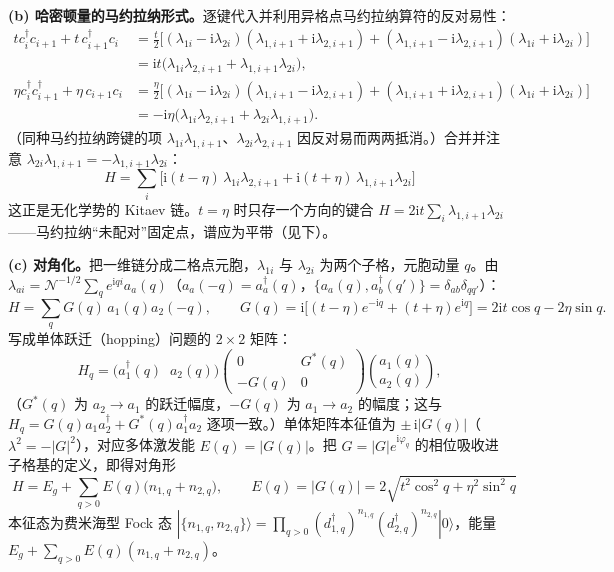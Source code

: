 \textbf{(b) 哈密顿量的马约拉纳形式。}逐键代入并利用异格点马约拉纳算符的反对易性：
\begin{align*}
tc^\dagger_ic_{i+1}+t\,c^\dagger_{i+1}c_i
&=\frac{t}{2}\big[(\lambda_{1i}-\mathrm{i}\lambda_{2i})(\lambda_{1,i+1}+\mathrm{i}\lambda_{2,i+1})+(\lambda_{1,i+1}-\mathrm{i}\lambda_{2,i+1})(\lambda_{1i}+\mathrm{i}\lambda_{2i})\big]\\
&=\mathrm{i}t\big(\lambda_{1i}\lambda_{2,i+1}+\lambda_{1,i+1}\lambda_{2i}\big),\\
\eta c^\dagger_ic^\dagger_{i+1}+\eta\,c_{i+1}c_i
&=\frac{\eta}{2}\big[(\lambda_{1i}-\mathrm{i}\lambda_{2i})(\lambda_{1,i+1}-\mathrm{i}\lambda_{2,i+1})+(\lambda_{1,i+1}+\mathrm{i}\lambda_{2,i+1})(\lambda_{1i}+\mathrm{i}\lambda_{2i})\big]\\
&=-\mathrm{i}\eta\big(\lambda_{1i}\lambda_{2,i+1}+\lambda_{2i}\lambda_{1,i+1}\big).
\end{align*}
（同种马约拉纳跨键的项 $\lambda_{1i}\lambda_{1,i+1}$、$\lambda_{2i}\lambda_{2,i+1}$ 因反对易而两两抵消。）合并并注意 $\lambda_{2i}\lambda_{1,i+1}=-\lambda_{1,i+1}\lambda_{2i}$：
\begin{equation*}
\boxed{\;H=\sum_i\Big[\mathrm{i}(t-\eta)\,\lambda_{1i}\lambda_{2,i+1}
+\mathrm{i}(t+\eta)\,\lambda_{1,i+1}\lambda_{2i}\Big]\;}
\end{equation*}
这正是无化学势的 Kitaev 链。$t=\eta$ 时只存一个方向的键合 $H=2\mathrm{i}t\sum_i\lambda_{1,i+1}\lambda_{2i}$——马约拉纳“未配对”固定点，谱应为平带（见下）。

\textbf{(c) 对角化。}把一维链分成二格点元胞，$\lambda_{1i}$ 与 $\lambda_{2i}$ 为两个子格，元胞动量 $q$。由 $\lambda_{ai}=\mathcal{N}^{-1/2}\sum_qe^{\mathrm{i}qi}a_a(q)$（$a_a(-q)=a^\dagger_a(q)$，$\{a_a(q),a^\dagger_b(q')\}=\delta_{ab}\delta_{qq'}$）：
\begin{equation*}
H=\sum_qG(q)\,a_1(q)a_2(-q),\qquad
G(q)=\mathrm{i}\big[(t-\eta)e^{-\mathrm{i}q}+(t+\eta)e^{\mathrm{i}q}\big]
=2\mathrm{i}t\cos q-2\eta\sin q .
\end{equation*}
写成单体跃迁（hopping）问题的 $2\times2$ 矩阵：
\begin{equation*}
H_q=\big(a_1^\dagger(q)\;\;a_2(q)\big)
\begin{pmatrix}0&G^*(q)\\-G(q)&0\end{pmatrix}
\binom{a_1(q)}{a_2(q)} ,
\end{equation*}
（$G^*(q)$ 为 $a_2\to a_1$ 的跃迁幅度，$-G(q)$ 为 $a_1\to a_2$ 的幅度；这与 $H_q=G(q)a_1a_2^\dagger+G^*(q)a_1^\dagger a_2$ 逐项一致。）单体矩阵本征值为 $\pm\,\mathrm{i}|G(q)|$（$\lambda^2=-|G|^2$），对应多体激发能 $E(q)=|G(q)|$。把 $G=|G|e^{\mathrm{i}\varphi_q}$ 的相位吸收进子格基的定义，即得对角形
\begin{equation*}
\boxed{\;H=E_g+\sum_{q>0}E(q)\big(n_{1,q}+n_{2,q}\big),\qquad
E(q)=|G(q)|=2\sqrt{t^2\cos^2q+\eta^2\sin^2q}\;}
\end{equation*}
本征态为费米海型 Fock 态 $|\{n_{1,q},n_{2,q}\}\rangle=\prod_{q>0}(d^\dagger_{1,q})^{n_{1,q}}(d^\dagger_{2,q})^{n_{2,q}}|0\rangle$，能量 $E_g+\sum_{q>0}E(q)(n_{1,q}+n_{2,q})$。

